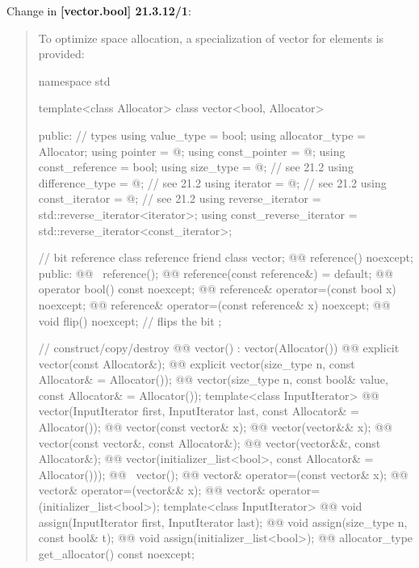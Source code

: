 \documentclass{wg21}
\begin{document}
Change in \textbf{[vector.bool] 21.3.12/1}:
\begin{quote}
To optimize space allocation, a specialization of vector for 
elements is provided:

\begin{codeblock}
namespace std {
  template<class Allocator>
  class vector<bool, Allocator> {
  public:
    // types
    using value_type             = bool;
    using allocator_type         = Allocator;
    using pointer                = @\impdef@;
    using const_pointer          = @\impdef@;
    using const_reference        = bool;
    using size_type              = @\impdef@; // see 21.2
    using difference_type        = @\impdef@; // see 21.2
    using iterator               = @\impdef@; // see 21.2
    using const_iterator         = @\impdef@; // see 21.2
    using reverse_iterator       = std::reverse_iterator<iterator>;
    using const_reverse_iterator = std::reverse_iterator<const_iterator>;

    // bit reference
    class reference {
      friend class vector;
      @@ reference() noexcept;
    public:
      @@ ~reference();
      @@ reference(const reference&) = default;
      @@ operator bool() const noexcept;
      @@ reference& operator=(const bool x) noexcept;
      @@ reference& operator=(const reference& x) noexcept;
      @@ void flip() noexcept;     // flips the bit
    };

    // construct/copy/destroy
    @@ vector() : vector(Allocator()) { }
    @@ explicit vector(const Allocator&);
    @@ explicit vector(size_type n, const Allocator& = Allocator());
    @@ vector(size_type n, const bool& value, const Allocator& = Allocator());
    template<class InputIterator>
      @@ vector(InputIterator first, InputIterator last, const Allocator& = Allocator());
    @@ vector(const vector& x);
    @@ vector(vector&& x);
    @@ vector(const vector&, const Allocator&);
    @@ vector(vector&&, const Allocator&);
    @@ vector(initializer_list<bool>, const Allocator& = Allocator()));
    @@ ~vector();
    @@ vector& operator=(const vector& x);
    @@ vector& operator=(vector&& x);
    @@ vector& operator=(initializer_list<bool>);
    template<class InputIterator>
      @@ void assign(InputIterator first, InputIterator last);
    @@ void assign(size_type n, const bool& t);
    @@ void assign(initializer_list<bool>);
    @@ allocator_type get_allocator() const noexcept;

}}
\end{codeblock}
\end{quote}
\end{document}
